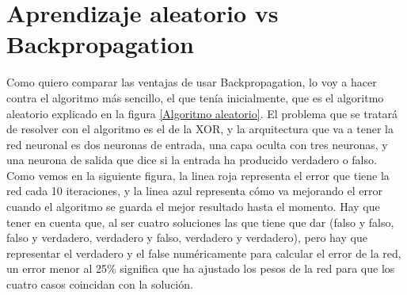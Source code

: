 \section{Aprendizaje aleatorio vs Backpropagation}
Como quiero comparar las ventajas de usar Backpropagation, lo voy a hacer contra el algoritmo más sencillo, el que tenía inicialmente, que es el algoritmo aleatorio explicado en la figura \ref{Algoritmo aleatorio}. El problema que se tratará de resolver con el algoritmo es el de la XOR, y la arquitectura que va a tener la red neuronal es dos neuronas de entrada, una capa oculta con tres neuronas, y una neurona de salida que dice si la entrada ha producido verdadero o falso. 
\\
Como vemos en la siguiente figura, la linea roja representa el error que tiene la red cada 10 iteraciones, y la linea azul representa cómo va mejorando el error cuando el algoritmo se guarda el mejor resultado hasta el momento. Hay que tener en cuenta que, al ser cuatro soluciones las que tiene que dar (falso y falso, falso y verdadero, verdadero y falso, verdadero y verdadero), pero hay que representar el verdadero y el false numéricamente para calcular el error de la red, un error menor al 25\% significa que ha ajustado los pesos de la red para que los cuatro casos coincidan con la solución.
